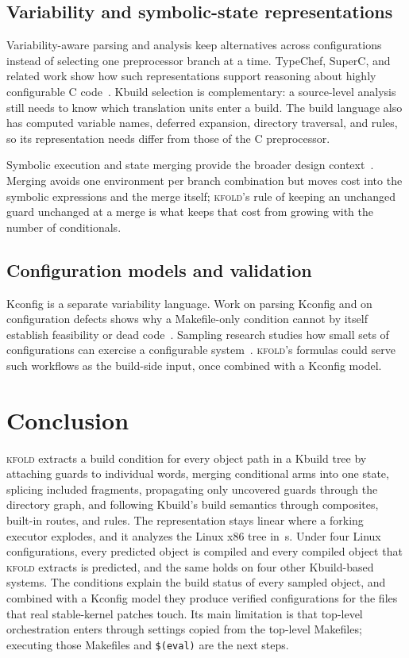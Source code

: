 \documentclass[acmsmall,screen,review]{acmart}
\newcommand{\tool}{\textsc{kfold}\xspace}
\begin{document}
\subsection{Variability and symbolic-state representations}
Variability-aware parsing and analysis keep alternatives across configurations instead of selecting one preprocessor branch at a time. TypeChef, SuperC, and related work show how such representations support reasoning about highly configurable C code~\cite{kenner2010typechef,kastner2011variability,gazzillo2012superc,liebig2011variability}. Kbuild selection is complementary: a source-level analysis still needs to know which translation units enter a build. The build language also has computed variable names, deferred expansion, directory traversal, and rules, so its representation needs differ from those of the C preprocessor.

Symbolic execution and state merging provide the broader design context~\cite{king1976symbolic,kuznetsov2012efficient}. Merging avoids one environment per branch combination but moves cost into the symbolic expressions and the merge itself; \tool's rule of keeping an unchanged guard unchanged at a merge is what keeps that cost from growing with the number of conditionals.

\subsection{Configuration models and validation}
Kconfig is a separate variability language. Work on parsing Kconfig and on configuration defects shows why a Makefile-only condition cannot by itself establish feasibility or dead code~\cite{dietrich2012variability,nadi2014where,tartler2011dead}. Sampling research studies how small sets of configurations can exercise a configurable system~\cite{medeiros2016comparison}. \tool's formulas could serve such workflows as the build-side input, once combined with a Kconfig model.

\section{Conclusion}
\label{sec:conclusion}

\tool extracts a build condition for every object path in a Kbuild tree by attaching guards to individual words, merging conditional arms into one state, splicing included fragments, propagating only uncovered guards through the directory graph, and following Kbuild's build semantics through composites, built-in routes, and rules. The representation stays linear where a forking executor explodes, and it analyzes the Linux \NLinuxVersion x86 tree in \NLinuxSeconds\,s. Under four Linux configurations, every predicted object is compiled and every compiled object that \tool extracts is predicted, and the same holds on four other Kbuild-based systems. The conditions explain the build status of every sampled object, and combined with a Kconfig model they produce verified configurations for the files that real stable-kernel patches touch. Its main limitation is that top-level orchestration enters through settings copied from the top-level Makefiles; executing those Makefiles and \texttt{\$(eval)} are the next steps.
\end{document}
